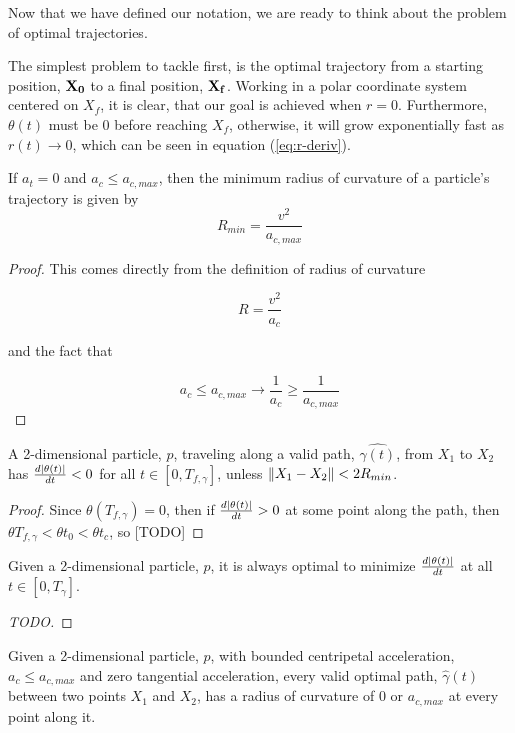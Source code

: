 Now that we have defined our notation, we are ready to think about the problem of optimal trajectories.

The simplest problem to tackle first, is the optimal trajectory from a starting position, $\mathbf{X_0}$ to a final position, $\mathbf{X_f}$. Working in a polar coordinate system centered on $X_f$, it is clear, that our goal is achieved when $r = 0$. Furthermore, $\theta(t)$ must be $0$ before reaching $X_f$, otherwise, it will grow exponentially fast as $r(t) \to 0$, which can be seen in equation (\ref{eq:r-deriv}).

\begin{lemma}
If $a_t=0$ and $a_c \le a_{c,max}$, then the minimum radius of curvature of a particle's trajectory is given by
\begin{equation}
R_{min} = \frac{v^2}{a_{c,max}}
\end{equation}
\end{lemma}

\begin{proof}
This comes directly from the definition of radius of curvature 

\[
R = \frac{v^2}{a_c}
\]

and the fact that 

\[
a_c \le a_{c,max} \to \frac{1}{a_c} \ge \frac{1}{a_{c,max}}
\]
\end{proof}

\begin{theorem}
A 2-dimensional particle, $p$, traveling along a valid path, $\hat{\gamma(t)}$, from $X_1$ to $X_2$ has $\frac{d\abs{\theta(t)}}{dt} < 0$ for all $t \in [0, T_{f, \gamma}]$, unless $\norm{X_1 - X_2} < 2 R_{min}$.
\end{theorem}

\begin{proof}
Since $\theta(T_{f,\gamma}) = 0$, then if $\frac{d\abs{\theta(t)}}{dt} > 0$ at some point along the path, then $\theta{T_{f,\gamma}} < \theta{t_0} < \theta{t_c}$, so [TODO]
\end{proof}

\begin{theorem}
Given a 2-dimensional particle, $p$, it is always optimal to minimize $\frac{d\abs{\theta(t)}}{dt}$ at all $t \in [0, T_{\gamma}]$.
\end{theorem}

\begin{proof}
[TODO]
\end{proof}

\begin{theorem}
Given a 2-dimensional particle, $p$, with bounded centripetal acceleration, $a_c \le a_{c,max}$ and zero tangential acceleration, every valid optimal path, $\hat{\gamma}(t)$ between two points $X_1$ and $X_2$, has a radius of curvature of $0$ or $a_{c,max}$ at every point along it.
\end{theorem}


